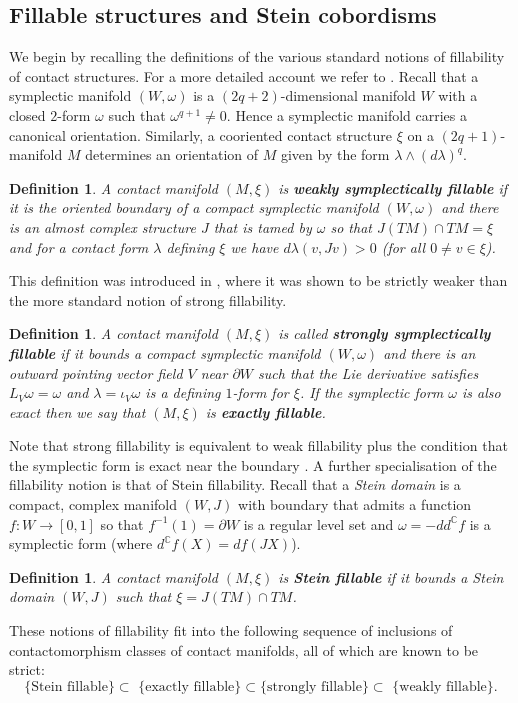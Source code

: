 \documentclass[12pt]{amsart}
\newcommand\del{\partial}
\newtheorem{Definition}[Theorem]{Definition}
\theoremstyle{remark}
\begin{document}
\subsection{Fillable structures and Stein cobordisms}
\label{subsec:fillandsurg}
We begin by recalling the definitions of the various standard notions
of fillability of contact structures. For a more  detailed account we
refer to \cite{Geiges08, Massot12}. Recall that a symplectic manifold $(W,
\omega)$ is a $(2q{+}2)$-dimensional manifold $W$ with a closed $2$-form
$\omega$ such that $\omega^{q{+}1} \neq 0$. Hence a symplectic manifold
carries a canonical orientation. Similarly, a cooriented contact
structure $\xi$ on a $(2q{+}1)$-manifold $M$ determines an orientation
of $M$ given by the form $\lambda \wedge (d \lambda)^q$.

\begin{Definition} \label{def:contact}
A contact manifold $(M,\xi)$ is \textbf{weakly symplectically
  fillable} if it is the oriented boundary of a compact symplectic manifold
$(W,\omega)$ and there is an almost complex structure $J$ that is
tamed by $\omega$ so that 
 $J(TM) \cap TM = \xi$ and for a contact form
$\lambda$ defining $\xi $ we have 
$ d \lambda (v,Jv) > 0$ (for all  $0\neq v \in \xi$).
%
\end{Definition}

\noindent This definition was introduced in \cite{Massot12}, where it
was shown to be strictly weaker than the more standard notion of
strong fillability.
%
\begin{Definition}
A contact manifold $(M,\xi)$ is called \textbf{strongly symplectically
  fillable} if it bounds a compact symplectic manifold $(W,\omega)$ and there
is an outward pointing vector field $V$ near $\del W$ such that the
Lie derivative satisfies $L_V\omega = \omega$ and $\lambda
=\iota_V\omega$ is a defining $1$-form for $\xi$.  If the symplectic
form $\omega$ is also exact then we say that $(M,\xi)$ is \textbf{exactly
  fillable}.
%
\end{Definition}
\noindent Note that strong fillability is equivalent to weak
fillability plus the condition that the symplectic form is exact near
the boundary \cite[Remark 1.11]{Massot12}. A further specialisation of
the fillability notion is that of Stein fillability. Recall that a
\emph{Stein domain} is a compact, complex manifold $(W,J)$ with
boundary that admits a function $f\colon W \to [0,1]$ so that
$f^{-1}(1) = \del W$ is a regular level set and $\omega = -dd^{\mathbb
  {C}} f$ is a symplectic form (where $d^{\mathbb {C}} f(X) = d
f(JX)$).
\begin{Definition}
A contact manifold $(M,\xi)$ is \textbf{Stein fillable} if it bounds a
Stein domain $(W,J)$ such that $\xi = J(TM) \cap TM$.
%
\end{Definition}
\noindent These notions of fillability fit into the 
following sequence of inclusions of contactomorphism classes of contact manifolds, all of which are known to be strict:
%
\begin{equation*} \label{eq:contactflavours}
%
\{\text{Stein fillable\} $\subset$ \{exactly fillable\} $\subset$
  \{strongly fillable\} $\subset$ \{weakly fillable\}}.
%
\end{equation*}
\end{document}
